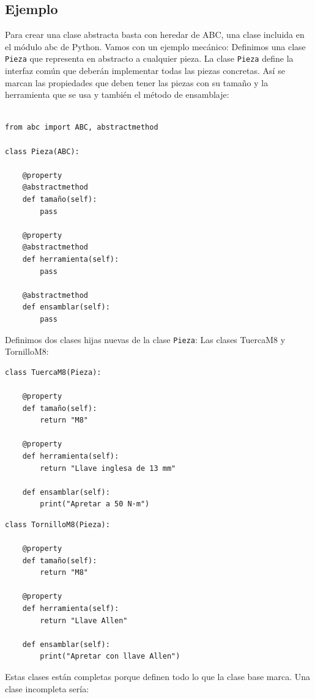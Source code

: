 \documentclass[11pt,a5paper,twoside]{book}
\begin{document}
\subsection{Ejemplo}
Para crear una clase abstracta basta con heredar de ABC, una clase incluida en el módulo abc de Python. 
Vamos con un ejemplo mecánico: Definimos una clase {\scriptsize \texttt{Pieza}} que representa en abstracto a cualquier pieza. La clase {\scriptsize \texttt{Pieza}} define la interfaz común que deberán implementar todas las piezas concretas.
Así se marcan las propiedades que deben tener las piezas con su tamaño y la herramienta que se usa y también el método de ensamblaje:

\newpage


\begin{tcolorbox}
\scriptsize
 \begin{verbatim}

from abc import ABC, abstractmethod

class Pieza(ABC):

    @property
    @abstractmethod
    def tamaño(self):
        pass

    @property
    @abstractmethod
    def herramienta(self):
        pass

    @abstractmethod
    def ensamblar(self):
        pass
\end{verbatim}
\end{tcolorbox}
Definimos dos clases hijas nuevas de la clase {\scriptsize \texttt{Pieza}}: Las clases TuercaM8 y TornilloM8:

\newpage


\begin{tcolorbox}
\scriptsize
 \begin{verbatim}
class TuercaM8(Pieza):

    @property
    def tamaño(self):
        return "M8"

    @property
    def herramienta(self):
        return "Llave inglesa de 13 mm"

    def ensamblar(self):
        print("Apretar a 50 N·m")
\end{verbatim}
\end{tcolorbox}


\begin{tcolorbox}
\scriptsize
 \begin{verbatim}
class TornilloM8(Pieza):

    @property
    def tamaño(self):
        return "M8"

    @property
    def herramienta(self):
        return "Llave Allen"

    def ensamblar(self):
        print("Apretar con llave Allen")
\end{verbatim}
\end{tcolorbox}
Estas clases están completas porque definen todo lo que la clase base marca. Una clase incompleta sería:
\end{document}

